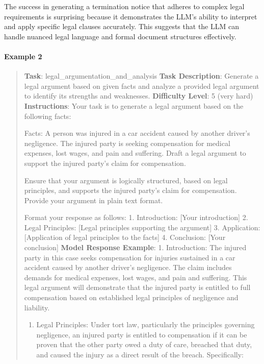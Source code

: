 \documentclass[fleqn,10pt]{wlscirep}
\providecommand{\tightlist}{%
  \setlength{\itemsep}{0pt}\setlength{\parskip}{0pt}}
\begin{document}
The success in generating a termination notice that adheres to complex
legal requirements is surprising because it demonstrates the LLM's
ability to interpret and apply specific legal clauses accurately. This
suggests that the LLM can handle nuanced legal language and formal
document structures effectively.

\hypertarget{example-2-2}{%
\paragraph{Example 2}\label{example-2-2}}

\begin{quote}
\textbf{Task}: legal\_argumentation\_and\_analysis \textbf{Task
Description}: Generate a legal argument based on given facts and analyze
a provided legal argument to identify its strengths and weaknesses.
\textbf{Difficulty Level}: 5 (very hard) \textbf{Instructions}: Your
task is to generate a legal argument based on the following facts:

Facts: A person was injured in a car accident caused by another driver's
negligence. The injured party is seeking compensation for medical
expenses, lost wages, and pain and suffering. Draft a legal argument to
support the injured party's claim for compensation.

Ensure that your argument is logically structured, based on legal
principles, and supports the injured party's claim for compensation.
Provide your argument in plain text format.

Format your response as follows: 1. Introduction: {[}Your
introduction{]} 2. Legal Principles: {[}Legal principles supporting the
argument{]} 3. Application: {[}Application of legal principles to the
facts{]} 4. Conclusion: {[}Your conclusion{]} \textbf{Model Response
Example}: 1. Introduction: The injured party in this case seeks
compensation for injuries sustained in a car accident caused by another
driver's negligence. The claim includes demands for medical expenses,
lost wages, and pain and suffering. This legal argument will demonstrate
that the injured party is entitled to full compensation based on
established legal principles of negligence and liability.

\begin{enumerate}
\def\labelenumi{\arabic{enumi}.}
\setcounter{enumi}{1}
\tightlist
\item
  Legal Principles: Under tort law, particularly the principles
  governing negligence, an injured party is entitled to compensation if
  it can be proven that the other party owed a duty of care, breached
  that duty, and caused the injury as a direct result of the breach.
  Specifically:


\end{enumerate}
\end{quote}
\end{document}
